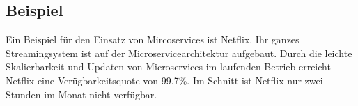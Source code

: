 \subsection{Beispiel}

Ein Beispiel für den Einsatz von Mircoservices ist Netflix. Ihr ganzes Streamingsystem ist auf der Microservicearchitektur aufgebaut. Durch die leichte Skalierbarkeit und Updaten von Microservices im laufenden Betrieb erreicht Netflix eine Verügbarkeitsquote von 99.7\%. Im Schnitt ist Netflix nur zwei Stunden im Monat nicht verfügbar.  

